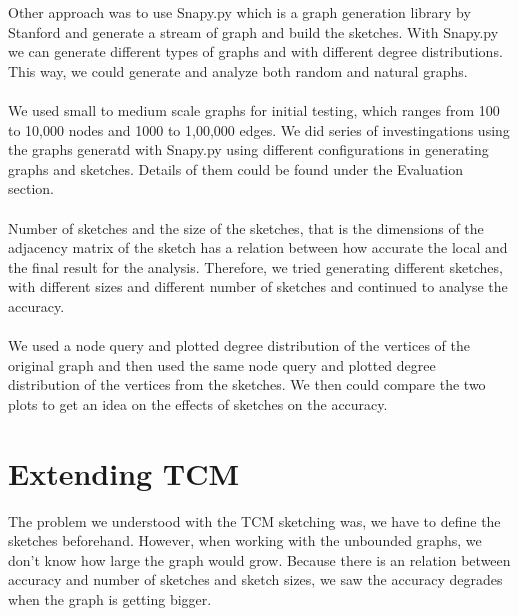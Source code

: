 \documentclass[12pt]{report}
\numberwithin{figure}{section}
\numberwithin{table}{section}
\begin{document}
Other approach was to use Snapy.py which is a graph generation library by Stanford and generate a stream of graph and build the sketches.  With Snapy.py we can generate different types of graphs and with different degree distributions. This way, we could generate and analyze both random and natural graphs.

\paragraph{}

We used small to medium scale graphs for initial testing, which ranges from 100 to 10,000 nodes and 1000 to 1,00,000 edges.  We did series of investingations using the graphs generatd with Snapy.py using different configurations in generating graphs and sketches. Details of them could be found under the Evaluation section.

\paragraph{}

Number of sketches and the size of the sketches, that is the dimensions of the adjacency matrix of the sketch has a relation between how accurate the local and the final result for the analysis. Therefore, we tried generating different sketches, with different sizes and different number of sketches and continued to analyse the accuracy. 

\paragraph{}

We used a node query and plotted degree distribution of the vertices of the original graph and then used the same node query and plotted degree distribution of the vertices from the sketches. We then could compare the two plots to get an idea on the effects of sketches on the accuracy. 

\section{Extending TCM}

The problem we understood with the TCM sketching was, we have to define the sketches beforehand. However, when working with the unbounded graphs, we don’t know how large the graph would grow. Because there is an relation between accuracy and number of sketches and sketch sizes, we saw the accuracy degrades when the graph is getting bigger. 
\end{document}
